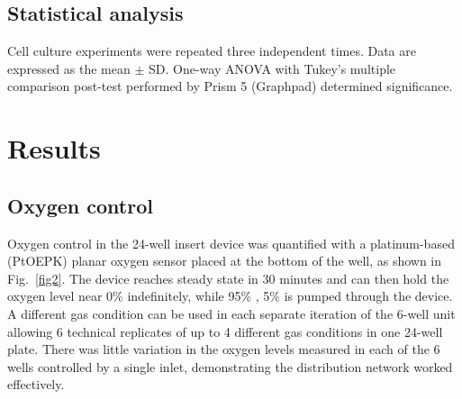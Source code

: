 \documentclass[10pt,letterpaper]{article}
\begin{document}
\subsection*{Statistical analysis}

Cell culture experiments were repeated three independent times. Data are expressed as the mean $\pm$ SD. One-way ANOVA with Tukey’s multiple comparison post-test performed by Prism 5 (Graphpad) determined significance.



\section*{Results}
\subsection*{Oxygen control}
Oxygen control in the 24-well insert device was quantified with a platinum-based (PtOEPK) planar oxygen sensor placed at the bottom of the well, as shown in Fig.~\ref{fig2}.
The device reaches steady state in 30 minutes and can then hold the oxygen level near 0\%  indefinitely, while 95\% , 5\%  is pumped through the device.
A different gas condition can be used in each separate iteration of the 6-well unit allowing 6 technical replicates of up to 4 different gas conditions in one 24-well plate.
There was little variation in the oxygen levels measured in each of the 6 wells controlled by a single inlet, demonstrating the distribution network worked effectively.
\end{document}
